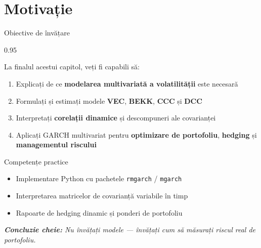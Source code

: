 \documentclass[9pt, aspectratio=169, t]{beamer}
\subtitle{Capitolul 5b: Modele GARCH Multivariate}
\begin{document}
{
\begin{frame}
    \titlepage
\end{frame}
}

\section{Motivație}

\begin{frame}{Obiective de învățare}
    \begin{cminipage}{0.95\textwidth}
    {\footnotesize
    \begin{block}{La finalul acestui capitol, veți fi capabili să:}
        \begin{enumerate}\setlength{\itemsep}{2pt}
            \item Explicați de ce \textbf{modelarea multivariată a volatilității} este necesară
            \item Formulați și estimați modele \textbf{VEC}, \textbf{BEKK}, \textbf{CCC} și \textbf{DCC}
            \item Interpretați \textbf{corelații dinamice} și descompuneri ale covarianței
            \item Aplicați GARCH multivariat pentru \textbf{optimizare de portofoliu}, \textbf{hedging} și \textbf{managementul riscului}
        \end{enumerate}
    \end{block}
    \vspace{0.1cm}
    \begin{alertblock}{Competențe practice}
        \begin{itemize}\setlength{\itemsep}{0pt}
            \item Implementare Python cu pachetele \texttt{rmgarch} / \texttt{mgarch}
            \item Interpretarea matricelor de covarianță variabile în timp
            \item Rapoarte de hedging dinamic și ponderi de portofoliu
        \end{itemize}
    \end{alertblock}
    \vspace{0.2cm}
    \textit{\textbf{Concluzie cheie:} Nu învățați modele --- învățați cum să măsurați riscul real de portofoliu.}
    }
    \end{cminipage}
\end{frame}
\end{document}
